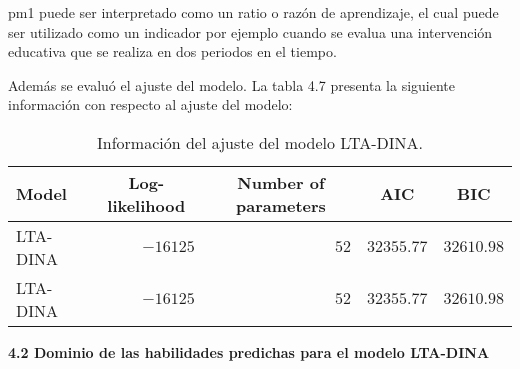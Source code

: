 \noindent
pm1 puede ser interpretado como un ratio o razón de aprendizaje, el cual puede ser utilizado como un indicador por ejemplo cuando se evalua una intervención educativa que se realiza en dos periodos en el tiempo.

Además se evaluó el ajuste del modelo. La tabla 4.7 presenta la siguiente información con respecto al ajuste del modelo:  

\begin{table}[H]
	\centering
	\caption{Información del ajuste del modelo LTA-DINA.}
	\begin{tabular}{lrrrr}
		\hline
		Model & \multicolumn{1}{c}{Log-likelihood} & \multicolumn{1}{c}{Number of parameters} & \multicolumn{1}{c}{AIC} & \multicolumn{1}{c}{BIC}\\
		\hline
		LTA-DINA 	& $-16125$  & $52$  & $32355.77$ & $32610.98$  \\
		LTA-DINA 		& $-16125$ & $52$ & $32355.77$  & $32610.98$ \\
		\hline
	\end{tabular}
\end{table}

\noindent
\textbf{4.2 Dominio de las habilidades predichas para el modelo LTA-DINA}\\









   




 



   








   







                 
